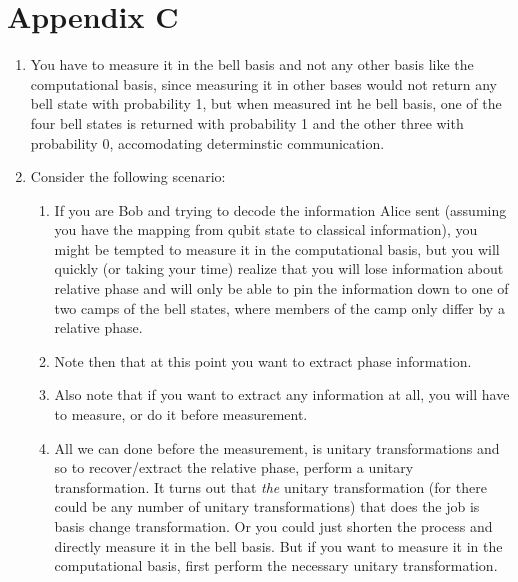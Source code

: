\documentclass[a4paper,12pt]{amsbook}
\newcommand{\0}{{$|0\rangle$}}
\newcommand{\1}{{$|1\rangle$}}
\begin{document}
\section{Appendix C}
\begin{enumerate}
    \item You have to measure it in the bell basis and not any other basis like the computational basis, since measuring it in other bases would not return any bell state with probability 1, but when measured int he bell basis, one of the four bell states is returned with probability 1 and the other three with probability 0, accomodating determinstic communication.

    \item Consider the following scenario:
\begin{enumerate}
    \item If you are Bob and trying to decode the information Alice sent (assuming you have the mapping from qubit state to classical information), you might be tempted to measure it in the computational basis, but you will quickly (or taking your time) realize that you will lose information about relative phase and will only be able to pin the information down to one of two camps of the bell states, where members of the camp only differ by a relative phase.
   \item  Note then that at this point you want to extract phase information.
   \item  Also note that if you want to extract any information at all, you will have to measure, or do it before measurement.
   \item  All we can done before the measurement, is unitary transformations and so to recover/extract the relative phase, perform a unitary transformation. It turns out that \textit{the} unitary transformation (for there could be any number of unitary transformations) that does the job is basis change transformation. Or you could just shorten the process and directly measure it in the bell basis. But if you want to measure it in the computational basis, first perform the necessary unitary transformation.
\end{enumerate}
\end{enumerate}
\end{document}
